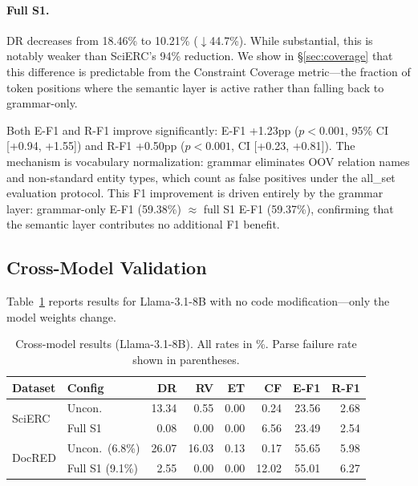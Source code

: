 \documentclass[11pt,a4paper]{article}
\begin{document}
\paragraph{Full S1.}
DR decreases from 18.46\% to 10.21\% ($\downarrow$44.7\%).
While substantial, this is notably weaker than SciERC's 94\% reduction.
We show in \S\ref{sec:coverage} that this difference is predictable from the Constraint Coverage metric---the fraction of token positions where the semantic layer is active rather than falling back to grammar-only.

Both E-F1 and R-F1 improve significantly: E-F1 +1.23pp ($p<0.001$, 95\% CI [+0.94, +1.55]) and R-F1 +0.50pp ($p<0.001$, CI [+0.23, +0.81]).
The mechanism is vocabulary normalization: grammar eliminates OOV relation names and non-standard entity types, which count as false positives under the all\_set evaluation protocol.
This F1 improvement is driven entirely by the grammar layer: grammar-only E-F1 (59.38\%) $\approx$ full S1 E-F1 (59.37\%), confirming that the semantic layer contributes no additional F1 benefit.

\subsection{Cross-Model Validation}
\label{sec:crossmodel}

Table~\ref{tab:crossmodel} reports results for Llama-3.1-8B with no code modification---only the model weights change.

\begin{table}[t]
\centering
\caption{Cross-model results (Llama-3.1-8B). All rates in \%. Parse failure rate shown in parentheses.}
\label{tab:crossmodel}
\small
\begin{tabular}{llrrrrrr}
\toprule
\textbf{Dataset} & \textbf{Config} & \textbf{DR} & \textbf{RV} & \textbf{ET} & \textbf{CF} & \textbf{E-F1} & \textbf{R-F1} \\
\midrule
\multirow{2}{*}{SciERC}
 & Uncon.  & 13.34 & 0.55 & 0.00 & 0.24 & 23.56 & 2.68 \\
 & Full S1 &  0.08 & 0.00 & 0.00 & 6.56 & 23.49 & 2.54 \\
\midrule
\multirow{2}{*}{DocRED}
 & Uncon.\ (6.8\%)  & 26.07 & 16.03 & 0.13 & 0.17 & 55.65 & 5.98 \\
 & Full S1 (9.1\%) &  2.55 & 0.00 & 0.00 & 12.02 & 55.01 & 6.27 \\
\bottomrule
\end{tabular}
\end{table}
\end{document}
